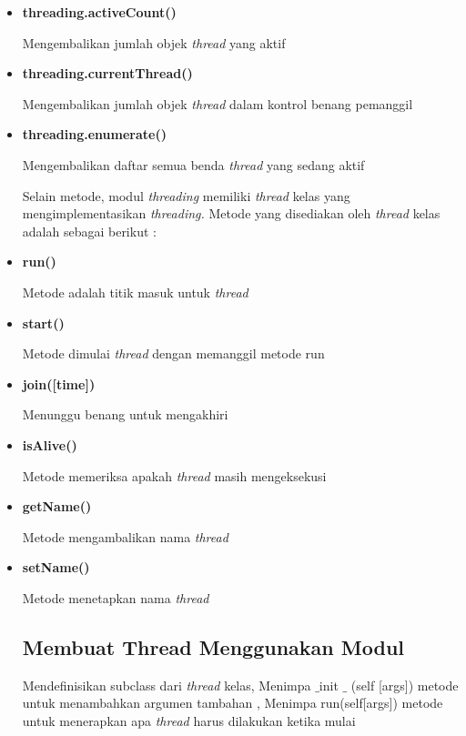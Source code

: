 \begin{itemize}
\item \textbf{t}\textbf{hreading.activeCount() } 

Mengembalikan jumlah objek \textit{thread} yang aktif 
\item \textbf{t}\textbf{hreading.currentThread() } 

Mengembalikan jumlah objek \textit{thread} dalam kontrol benang pemanggil 
\item \textbf{t}\textbf{hreading.enumerate() } 

Mengembalikan daftar semua benda \textit{thread}\textit{ }yang sedang aktif 

\vspace{12pt}
\hspace*{0.5in} Selain metode, modul \textit{thread}\textit{ing }memiliki \textit{thread}\textit{ }kelas yang mengimplementasikan \textit{thread}\textit{ing. }Metode yang disediakan oleh \textit{thread}\textit{ }kelas adalah sebagai berikut : 
\item \textbf{run()} 

Metode adalah titik masuk untuk \textit{thread} 
\item \textbf{start()} 

Metode dimulai\textbf{ }\textit{thread}\textit{ }dengan memanggil metode run 
\item \textbf{join(}\textbf{[time]}\textbf{)} 

Menunggu benang untuk mengakhiri 
\item \textbf{isAlive()} 

Metode memeriksa apakah\textbf{ }\textit{thread}\textit{ }masih mengeksekusi\textbf{ } 
\item \textbf{getName()} 

Metode mengambalikan nama\textbf{ }\textit{thread} 
\item \textbf{setName()} 

Metode menetapkan nama\textbf{ }\textit{thread} 
\vspace{12pt}

\subsection {Membuat Thread Menggunakan Modul} 
\hspace*{0.5in} Mendefinisikan subclass dari \textit{thread} kelas, Menimpa  $  \_  $init $  \_  $ (self [args]) metode untuk menambahkan argumen tambahan 
, Menimpa run(self[args]) metode untuk menerapkan apa \textit{thread} harus dilakukan ketika mulai


\end{itemize}
